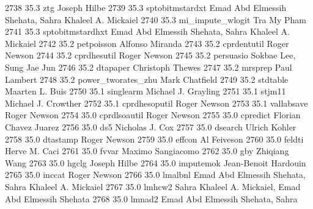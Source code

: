   2738     35.3    ztg           Joseph Hilbe                            
  2739     35.3    sptobitmstardxt  Emad Abd Elmessih Shehata, Sahra        
                                   Khaleel A. Mickaiel                     
  2740     35.3    mi_impute_wlogit  Tra My Pham                             
  2741     35.3    sptobitmstardhxt  Emad Abd Elmessih Shehata, Sahra        
                                   Khaleel A. Mickaiel                     
  2742     35.2    petpoisson    Alfonso Miranda                         
  2743     35.2    cprdentutil   Roger Newson                            
  2744     35.2    cprdhesutil   Roger Newson                            
  2745     35.2    persuasio     Sokbae Lee, Sung Jae Jun                
  2746     35.2    dtapaper      Christoph Thewes                        
  2747     35.2    mrsprep       Paul Lambert                            
  2748     35.2    power_tworates_zhu  Mark Chatfield                          
  2749     35.2    stdtable      Maarten L. Buis                         
  2750     35.1    singlearm     Michael J. Grayling                     
  2751     35.1    stjm11        Michael J. Crowther                     
  2752     35.1    cprdhesoputil  Roger Newson                            
  2753     35.1    vallabsave    Roger Newson                            
  2754     35.0    cprdlsoautil  Roger Newson                            
  2755     35.0    cpredict      Florian Chavez Juarez                   
  2756     35.0    ds5           Nicholas J. Cox                         
  2757     35.0    dsearch       Ulrich Kohler                           
  2758     35.0    dtastamp      Roger Newson                            
  2759     35.0    effcon        Al Feiveson                             
  2760     35.0    feldti        Herve M. Caci                           
  2761     35.0    fvvar         Maximo Sangiacomo                       
  2762     35.0    gby           Zhiqiang Wang                           
  2763     35.0    hgclg         Joseph Hilbe                            
  2764     35.0    imputemok     Jean-Benoit Hardouin                    
  2765     35.0    inccat        Roger Newson                            
  2766     35.0    lmalbnl       Emad Abd Elmessih Shehata, Sahra        
                                   Khaleel A. Mickaiel                     
  2767     35.0    lmhcw2        Sahra Khaleel A. Mickaiel, Emad Abd     
                                   Elmessih Shehata                        
  2768     35.0    lmnad2        Emad Abd Elmessih Shehata, Sahra        
